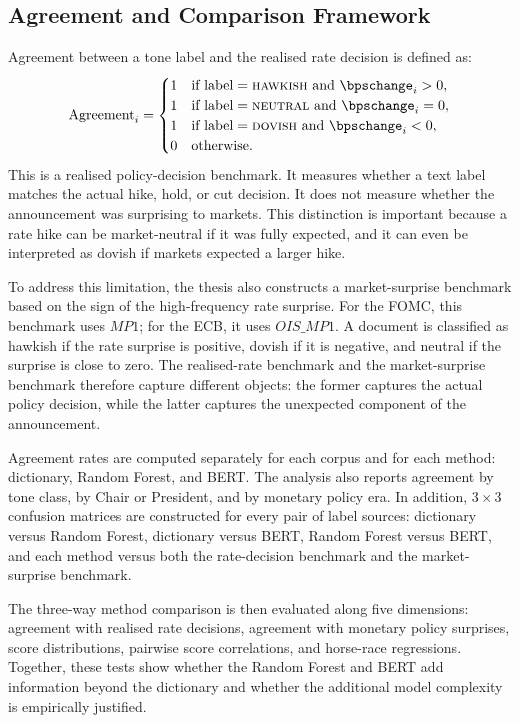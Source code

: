 \subsection{Agreement and Comparison Framework}
\label{sec:meth_agreement}
\label{sec:meth_comparison}

Agreement between a tone label and the realised rate decision is defined as:
%
\begin{equation}
\label{eq:agreement}
\text{Agreement}_i =
\begin{cases}
1 & \text{if label} = \text{\textsc{hawkish}} \text{ and } \bpschange_i > 0, \\
1 & \text{if label} = \text{\textsc{neutral}} \text{ and } \bpschange_i = 0, \\
1 & \text{if label} = \text{\textsc{dovish}}  \text{ and } \bpschange_i < 0, \\
0 & \text{otherwise.}
\end{cases}
\end{equation}
%
This is a realised policy-decision benchmark. It measures whether a text label
matches the actual hike, hold, or cut decision. It does not measure whether the
announcement was surprising to markets. This distinction is important because a
rate hike can be market-neutral if it was fully expected, and it can even be
interpreted as dovish if markets expected a larger hike.

To address this limitation, the thesis also constructs a market-surprise
benchmark based on the sign of the high-frequency rate surprise. For the FOMC,
this benchmark uses \(MP1\); for the ECB, it uses \(OIS\_MP1\). A document is
classified as hawkish if the rate surprise is positive, dovish if it is negative,
and neutral if the surprise is close to zero. The realised-rate benchmark and
the market-surprise benchmark therefore capture different objects: the former
captures the actual policy decision, while the latter captures the unexpected
component of the announcement.

Agreement rates are computed separately for each corpus and for each method:
dictionary, Random Forest, and BERT. The analysis also reports agreement by
tone class, by Chair or President, and by monetary policy era. In addition,
\(3 \times 3\) confusion matrices are constructed for every pair of label
sources: dictionary versus Random Forest, dictionary versus BERT, Random Forest
versus BERT, and each method versus both the rate-decision benchmark and the
market-surprise benchmark.

The three-way method comparison is then evaluated along five dimensions:
agreement with realised rate decisions, agreement with monetary policy
surprises, score distributions, pairwise score correlations, and horse-race
regressions. Together, these tests show whether the Random Forest and BERT add
information beyond the dictionary and whether the additional model complexity is
empirically justified.



